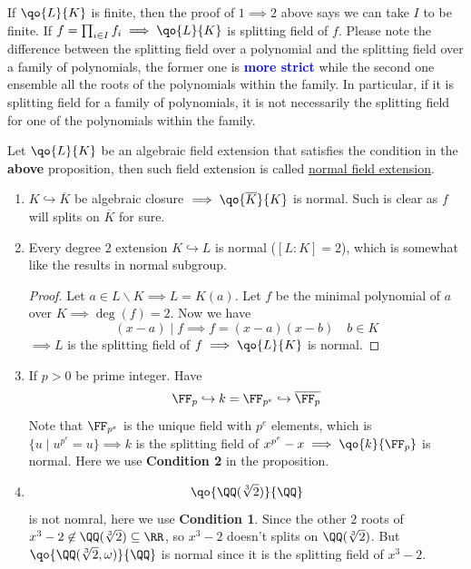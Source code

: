 \begin{remark}
	If \( \qo{L}{K} \) is finite, then the proof of \( 1\implies 2 \) above says we can take \( I \)
	to be finite. If \( f=\prod_{i\in I}f_i \implies \qo{L}{K} \) is splitting field of \( f \).
	Please note the difference between the splitting field over a polynomial and the splitting field
	over a family of polynomials, the former one is \textbf{\textcolor{blue}{more strict}} while the second one ensemble all the
	roots of the polynomials within the family. In particular, if it is splitting field for a family
	of polynomials, it is not necessarily the splitting field for one of the polynomials within the family.
\end{remark}


\begin{definition}
	Let \( \qo{L}{K} \) be an algebraic field extension that satisfies the condition in the \textbf{above} proposition, then
	such field extension is called \underline{normal field extension}.
\end{definition}

\begin{eg}
	\leavevmode
	\begin{enumerate}
		\item \( K \hookrightarrow \overline{K} \) be algebraic closure \( \implies \qo{\overline{K}}{K} \) is normal.
		      Such is clear as \( f \) will splits on \( \overline{K} \) for sure.
		\item Every degree \( 2 \) extension \( K \hookrightarrow L \) is normal (\( [L:K] = 2 \)),
		      which is somewhat like the results in normal subgroup.
		      \begin{proof}
			      Let \( a\in L \smallsetminus K \implies L = K(a) \). Let \( f \) be the minimal polynomial
			      of \( a \) over \( K \implies \deg(f) = 2 \). Now we have
			      \[
				      (x-a) \mid f \implies f = (x-a)(x-b) \quad b \in K
			      \]
			      \( \implies L\) is the splitting field of \( f \implies \qo{L}{K} \) is normal.
		      \end{proof}
		\item If \( p > 0 \) be prime integer. Have
		      \[
			      \FF_p \hookrightarrow k = \FF_{p^e} \hookrightarrow \overline{\FF_p}
		      \]
		      Note that \( \FF_{p^e} \) is the unique field with \( p^e \) elements, which is \( \{u \; | \;
		      u^{p^e} = u\} \implies k \) is the splitting field of \( x^{p^e} - x \implies \qo{k}{\FF_p} \)
		      is normal. Here we use \textbf{Condition 2} in the proposition.
		\item
		      \[
			      \qo{\QQ(\sqrt[3]{2})}{\QQ}
		      \]
		      is not nomral, here we use \textbf{Condition 1}. Since the other \( 2 \) roots of \( x^3 - 2 \not\in \QQ(\sqrt[3]{2}) \subseteq
		      \RR\), so \( x^3 - 2 \) doesn't splits on \( \QQ(\sqrt[3]{2}) \). But \( \qo{\QQ(\sqrt[3]{2}, \omega)}{\QQ} \) is normal since it is the splitting field
		      of \( x^3-2 \).
	\end{enumerate}
\end{eg}

